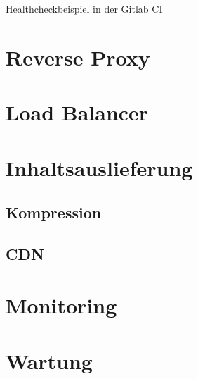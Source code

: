 \begin{listing}
    \label{lst:healthcheck}
    \inputminted{sh}{snippets/sh/healthcheck.sh}
    \caption{Healthcheckbeispiel in der Gitlab CI}
\end{listing}

\section{Reverse Proxy}

\section{Load Balancer}

\section{Inhaltsauslieferung}

\subsection{Kompression}
\subsection{CDN}

\section{Monitoring}

\section{Wartung}

